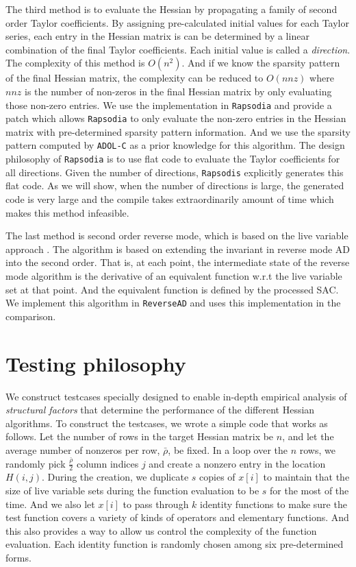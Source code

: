 \documentclass[12pt]{article}
\begin{document}
The third method is to evaluate the Hessian by propagating a family of second order Taylor coefficients\cite{griewank2000evaluating}. By assigning pre-calculated initial values for each Taylor series, each entry in the Hessian matrix is can be determined by a linear combination of the final Taylor coefficients. Each initial value is called a {\em direction}. The complexity of this method is $O(n^2)$. And if we know the sparsity pattern of the final Hessian matrix, the complexity can be reduced to $O(nnz)$ where $nnz$ is the number of non-zeros in the final Hessian matrix by only evaluating those non-zero entries. We use the implementation in {\tt Rapsodia} \cite{charpentier2009fast} and provide a patch which allows {\tt Rapsodia} to only evaluate the non-zero entries in the Hessian matrix with pre-determined sparsity pattern information. And we use the sparsity pattern computed by {\tt ADOL-C} as a prior knowledge for this algorithm. The design philosophy of {\tt Rapsodia} is to use flat code to evaluate the Taylor coefficients for all directions. Given the number of directions, {\tt Rapsodis} explicitly generates this flat code. As we will show, when the number of directions is large, the generated code is very large and the compile takes extraordinarily amount of time which makes this method infeasible. 

The last method is second order reverse mode, which is based on the live variable approach \cite{wang2016capitalizing}. The algorithm is based on extending the invariant in reverse mode AD into the second order. That is, at each point, the intermediate state of the reverse mode algorithm is the derivative of an equivalent function w.r.t the live variable set at that point. And the equivalent function is defined by the processed SAC. We implement this algorithm in  {\tt ReverseAD} and uses this implementation in the comparison.

\section*{Testing philosophy}
We construct testcases specially designed to enable in-depth empirical analysis of {\em structural factors} that determine the performance of the  different Hessian algorithms. 
To construct the testcases, we wrote a simple code that works as follows. 
Let the number of rows in the target Hessian matrix be $n$, and let the average number of nonzeros per row, $\bar{\rho}$, be fixed.
In a loop over the $n$ rows, we randomly pick $\frac{\bar{\rho}}{2}$ column indices $j$ and create a nonzero entry in the location $H(i,j)$. During the creation, we duplicate $s$ copies of $x[i]$ to maintain that the size of live variable sets during the function evaluation to be $s$ for the most of the time. And we also let $x[i]$ to pass through $k$ identity functions to make sure the test function covers a variety of kinds of operators and elementary functions. And this also provides a way to allow us control the complexity of the function evaluation. Each identity function is randomly chosen among six pre-determined forms. 
\end{document}
